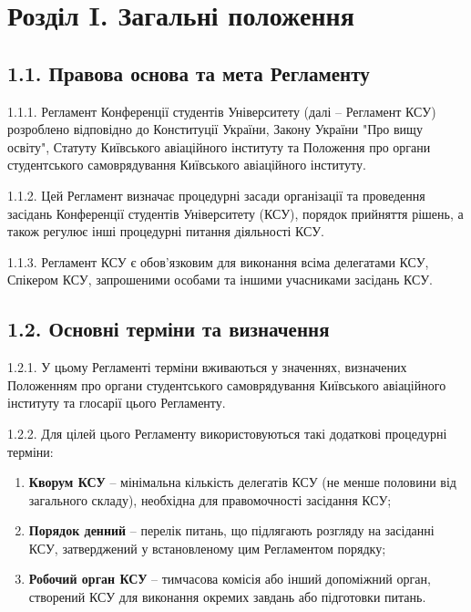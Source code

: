 \section*{Розділ I. Загальні положення}

\subsection*{1.1. Правова основа та мета Регламенту}
    1.1.1. Регламент Конференції студентів Університету (далі -- Регламент КСУ) розроблено відповідно до Конституції України, Закону України "Про вищу освіту", Статуту Київського авіаційного інституту та Положення про органи студентського самоврядування Київського авіаційного інституту.

    1.1.2. Цей Регламент визначає процедурні засади організації та проведення засідань Конференції студентів Університету (КСУ), порядок прийняття рішень, а також регулює інші процедурні питання діяльності КСУ.

    1.1.3. Регламент КСУ є обов'язковим для виконання всіма делегатами КСУ, Спікером КСУ, запрошеними особами та іншими учасниками засідань КСУ.

\subsection*{1.2. Основні терміни та визначення}
    1.2.1. У цьому Регламенті терміни вживаються у значеннях, визначених Положенням про органи студентського самоврядування Київського авіаційного інституту та глосарії цього Регламенту.

    1.2.2. Для цілей цього Регламенту використовуються такі додаткові процедурні терміни:

        \begin{enumerate}[label=\alph*)]
            \item \textbf{Кворум КСУ} -- мінімальна кількість делегатів КСУ (не менше половини від загального складу), необхідна для правомочності засідання КСУ;
            \item \textbf{Порядок денний} -- перелік питань, що підлягають розгляду на засіданні КСУ, затверджений у встановленому цим Регламентом порядку;
            \item \textbf{Робочий орган КСУ} -- тимчасова комісія або інший допоміжний орган, створений КСУ для виконання окремих завдань або підготовки питань.
        \end{enumerate}

